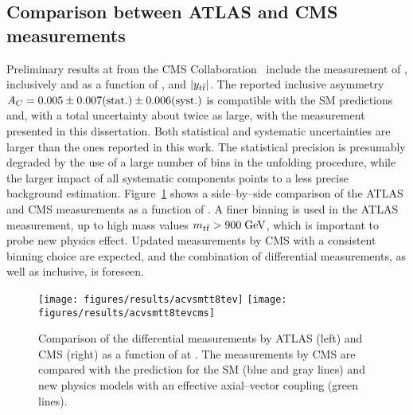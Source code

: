 \subsection{Comparison between ATLAS and CMS measurements}

Preliminary results at \eighttev{} from the CMS
Collaboration~\cite{CMS-PAS-TOP-12-033} include the measurement of
\ac{}, inclusively and as a function of \mtt{}, \pttt{} and $|y_{t\bar{t}}{}|$.
The reported inclusive asymmetry
\mbox{$A_C{}=0.005\pm0.007(\rm{stat.})\pm0.006(\rm{syst.})$} is compatible with the SM
predictions and, with a total uncertainty about twice as large, with
the measurement presented in this dissertation. Both
statistical and systematic uncertainties are larger than the ones
reported in this work. The statistical precision is presumably
degraded by the use of a large number of \dy{} bins in the unfolding
procedure, while the larger impact of all systematic components
points to a less precise background estimation.
Figure~\ref{fig:comparediff8tev} shows a side--by--side comparison of
the ATLAS and CMS measurements as a function of \mtt{}. A finer
binning is used in the ATLAS measurement, up to
high mass values $m_{t\bar{t}}{}>900\; \mathrm{GeV}$, which is important to probe new
physics effect. Updated measurements by CMS with a consistent binning
choice are expected, and the combination of differential measurements,
as well as inclusive, is foreseen.

\begin{figure}[!htb]\centering
  \texttt{[image: figures/results/acvsmtt8tev]}
  \texttt{[image: figures/results/acvsmtt8tevcms]}
  \caption{Comparison of the differential \ac{} measurements by ATLAS
    (left) and CMS (right) as a function of \mtt{} at \eighttev{}. The measurements
    by CMS are compared with the prediction for the SM (blue and gray lines) and
    new physics models with an effective axial--vector coupling (green lines).} 
  \label{fig:comparediff8tev}
\end{figure}
